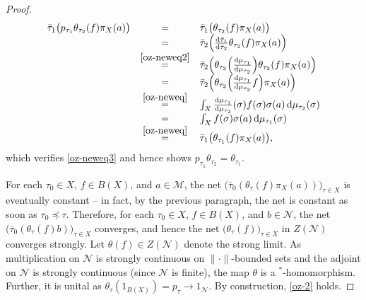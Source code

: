 \documentclass[a4paper,11pt]{amsart}
\theoremstyle{definition}
\numberwithin{equation}{section}
\numberwithin{theorem}{section}
\begin{document}
\begin{proof}
\begin{equation}
\begin{array}{rcl}
        \bar\tau_1\big(p_{\tau_1}\theta_{\tau_2}(f)\pi_X(a)\big) &=&\bar\tau_1\big(\theta_{\tau_2}(f)\pi_X(a)\big)\\
        &=&\bar\tau_2\Big(\frac{{\rm d} \bar\tau_1}{{\rm d} \bar \tau_2} \theta_{\tau_2}(f)\pi_X(a)\Big) \\
        &\stackrel{\eqref{oz-neweq2}}{=}& \bar\tau_2\Big(\theta_{\tau_2}\Big(\frac{{\rm d} \mu_{\tau_1}}{{\rm d} \mu_{\tau_2}}\Big)\theta_{\tau_2}(f)\pi_X(a)\Big) \\
        &=& \bar\tau_2\Big(\theta_{\tau_2}\Big(\frac{{\rm d} \mu_{\tau_1}}{{\rm d} \mu_{\tau_2}} f\Big)\pi_X(a)\Big) \\
        &\stackrel{\eqref{oz-neweq}}{=}& \int_X \frac{{\rm d} \mu_{\tau_1}}{{\rm d} \mu_{\tau_2}}(\sigma) f(\sigma) \sigma(a) \, {\rm d} \mu_{\tau_2}(\sigma) \\
        &=& \int_X f(\sigma) \sigma(a) \, {\rm d}\mu_{\tau_1}(\sigma) \\
        &\stackrel{\eqref{oz-neweq}}{=}& \bar\tau_1\big( \theta_{\tau_1}(f)\pi_X(a)\big),
    \end{array}
    \end{equation}
    which verifies \eqref{oz-neweq3} and hence shows $p_{\tau_1} \theta_{\tau_2} = \theta_{\tau_1}$.

    For each $\tau_0 \in X$, $f \in B(X)$, and $a \in \mathcal M$, the net $\big(\bar\tau_0(\theta_\tau(f)\pi_X(a))\big)_{\tau \in X}$ is eventually constant -- in fact, by the previous paragraph, the net is constant as soon as $\tau_0 \preceq \tau$.  Therefore, for each $\tau_0 \in X$, $f \in B(X)$, and $b \in \mathcal N$, the net $\big(\bar\tau_0(\theta_\tau(f)b)\big)_{\tau \in X}$ converges, and hence the net $\big(\theta_\tau(f)\big)_{\tau \in X}$ in $Z(\mathcal N)$ converges strongly.  Let $\theta(f) \in Z(\mathcal N)$ denote the strong limit.  As multiplication on $\mathcal N$ is strongly continuous on $\|\cdot\|$-bounded sets and the adjoint on $\mathcal N$ is strongly continuous (since $\mathcal N$ is finite), the map $\theta$ is a $^*$-homomorphism.  Further, it is unital as $\theta_\tau(1_{B(X)}) = p_\tau \rightarrow 1_{\mathcal N}$.  By construction, \eqref{oz-2} holds.
\end{proof}
\end{document}
